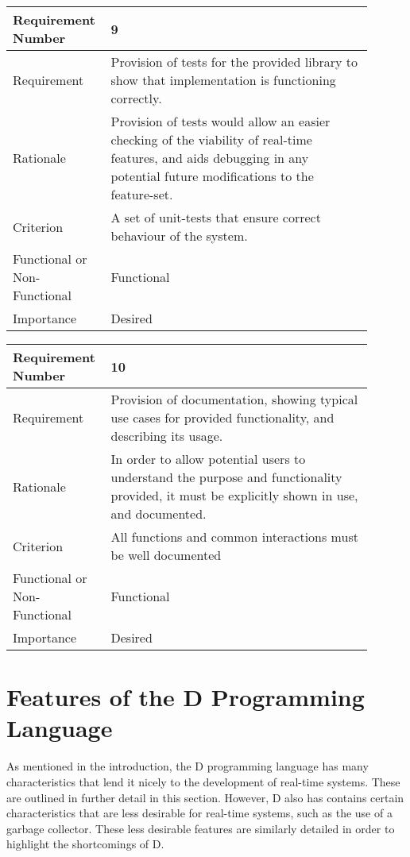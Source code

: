 \begin{table}[!htbp]
\centering
\begin{tabular}{|L{0.2\linewidth}|L{0.7\linewidth}|}
\hline
Requirement Number   & 9 \\ \hline
Requirement & Provision of tests for the provided library to show that 
                implementation is functioning correctly. \\ \hline
Rationale      & Provision of tests would allow an easier checking of the viability of  
                real-time features, and aids debugging in any potential future 
                modifications to the feature-set. \\ \hline
Criterion      & A set of unit-tests that ensure correct behaviour of the system. \\ \hline
Functional or Non-Functional & Functional \\ \hline
Importance     & Desired \\ \hline
\end{tabular}
\end{table}
\begin{table}[!htbp]
\centering
\begin{tabular}{|L{0.2\linewidth}|L{0.7\linewidth}|}
\hline
Requirement Number & 10 \\ \hline
Requirement & Provision of documentation, showing typical use cases for provided 
                functionality, and describing its usage. \\ \hline
Rationale      & In order to allow potential users to understand the purpose and 
                functionality provided, it must be explicitly shown in use, and
                documented.  \\ \hline
Criterion      & All functions and common interactions must be well documented \\ \hline
Functional or Non-Functional & Functional \\
Importance     & Desired \\ \hline
\end{tabular}
\end{table}
\FloatBarrier



\section{Features of the D Programming Language}
As mentioned in the introduction, the D programming language has many 
characteristics that lend it nicely to the development of real-time systems.
These are outlined in further detail in this section. 
However, D also has contains certain characteristics that are less desirable for 
real-time systems, such as the use of a garbage collector. 
These less desirable features are similarly detailed in order to highlight the 
shortcomings of D. 

